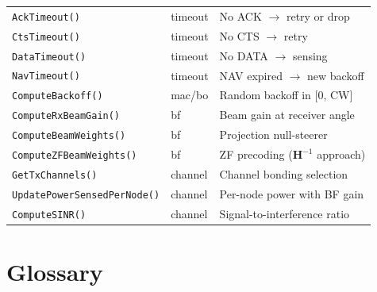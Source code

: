 \documentclass[11pt,a4paper]{article}
\begin{document}
\begin{longtable}{p{5.5cm} p{2.5cm} p{6cm}}
\texttt{AckTimeout()}              & timeout   & No ACK $\to$ retry or drop \\
\texttt{CtsTimeout()}              & timeout   & No CTS $\to$ retry \\
\texttt{DataTimeout()}             & timeout   & No DATA $\to$ sensing \\
\texttt{NavTimeout()}              & timeout   & NAV expired $\to$ new backoff \\
\texttt{ComputeBackoff()}          & mac/bo    & Random backoff in [0, CW] \\
\texttt{ComputeRxBeamGain()}       & bf        & Beam gain at receiver angle \\
\texttt{ComputeBeamWeights()}      & bf        & Projection null-steerer \\
\texttt{ComputeZFBeamWeights()}    & bf        & ZF precoding ($\mathbf{H}^{-1}$ approach) \\
\texttt{GetTxChannels()}           & channel   & Channel bonding selection \\
\texttt{UpdatePowerSensedPerNode()} & channel  & Per-node power with BF gain \\
\texttt{ComputeSINR()}             & channel   & Signal-to-interference ratio \\
\end{longtable}

\section{Glossary}
\label{sec:glossary}
\end{document}

